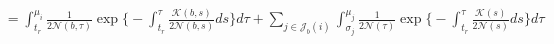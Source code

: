 \documentclass[11pt]{article}
\begin{document}
\begin{equation}
\begin{aligned}
	&= \int_{t_r}^{\mu_i}
		\frac{1}{2\mathcal{N}(b,\tau)} \exp 
			\bigg\{
				-\int_{t_r}^{\tau} \frac{\mathcal{K}(b,s)}{2\mathcal{N}(b,s)}ds
			\bigg\} d\tau + 
			\sum_{j \in \mathcal{J}_b(i)}
			\int_{\sigma_j}^{\mu_j}
			\frac{1}{2\mathcal{N}(\tau)} \exp 
			\bigg\{
				-\int_{t_r}^{\tau}
				\frac{\mathcal{K}(s)}{2\mathcal{N}(s)}ds
			\bigg\} d\tau\\
\end{aligned}			
\end{equation}







\end{document}
